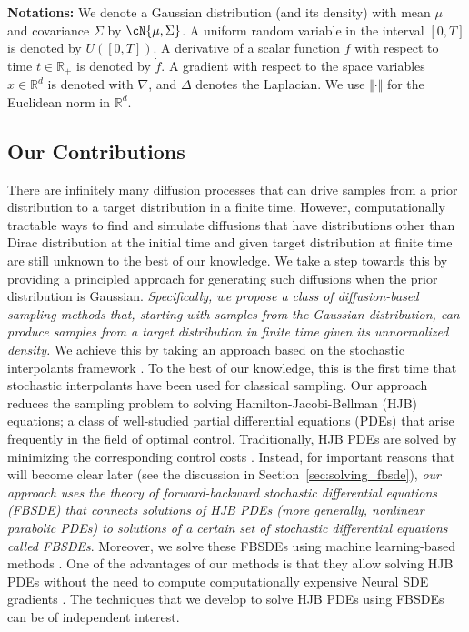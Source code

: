 \textbf{Notations:}
We denote a Gaussian distribution (and its density) with mean $\mu$ and covariance $\Sigma$ by $\cN{\mu,\Sigma}$. A uniform random variable in the interval $[0,T]$ is denoted by $U([0,T])$. A derivative  of a scalar function $f$ with respect to time $t\in \mathbb{R}_+$ is denoted by $\dot{f}$. A gradient with respect to the space variables $x\in \mathbb{R}^d$ is denoted with $\nabla$, and $\Delta$ denotes the Laplacian. We use $\Vert\cdot\Vert$ for the  Euclidean norm in $\mathbb{R}^d$.

\subsection{Our Contributions}

There are infinitely many diffusion processes that can drive samples from a prior distribution to a target distribution in a finite time. However, computationally tractable ways to find and simulate diffusions that have distributions other than Dirac distribution at the initial time and given target distribution at finite time are still unknown to the best of our knowledge. We take a step towards this by providing a principled approach for generating such diffusions when the prior distribution is Gaussian. \emph{Specifically, we propose a class of diffusion-based sampling methods that, starting with samples from the Gaussian distribution, can produce samples from a target distribution in finite time given its unnormalized density.} We achieve this by taking an approach based on the stochastic interpolants framework \cite{albergo_stochastic_2023}. To the best of our knowledge, this is the first time that stochastic interpolants have been used for classical sampling. Our approach reduces the sampling problem to solving Hamilton-Jacobi-Bellman (HJB) equations; a class of well-studied partial differential equations (PDEs) that arise frequently in the field of optimal control. Traditionally, HJB PDEs are solved by minimizing the corresponding control costs \cite{zhang_path_2022}. Instead, for important reasons that will become clear later (see the discussion in Section~\ref{sec:solving_fbsde}), \emph{our approach uses the theory of forward-backward stochastic differential equations (FBSDE) that connects solutions of HJB PDEs (more generally, nonlinear parabolic PDEs) to solutions of a certain set of stochastic differential equations called FBSDEs}. 
Moreover, we solve these FBSDEs using machine learning-based methods \cite{han_solving_2018,e_algorithms_2022,raissi_forward-backward_2018}. One of the advantages of our methods is that they allow solving HJB PDEs without the need to compute computationally expensive Neural SDE gradients \cite{zhang_path_2022,berner_optimal_2023}. The techniques that we develop to solve HJB PDEs using FBSDEs can be of independent interest.  
